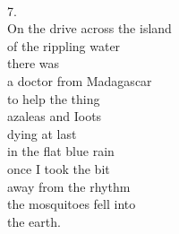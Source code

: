 \documentclass[smalldemyvopaper,11pt,twoside,onecolumn,openright,extrafontsizes]{memoir}
\begin{document}
\\7.
\\On the drive across the island
\\of the rippling water
\\there was
\\a doctor from Madagascar
\\to help the thing
\\azaleas and Ioots
\\dying at last
\\in the flat blue rain
\\once I took the bit
\\away from the rhythm
\\the mosquitoes fell into
\\the earth.
\end{document}
